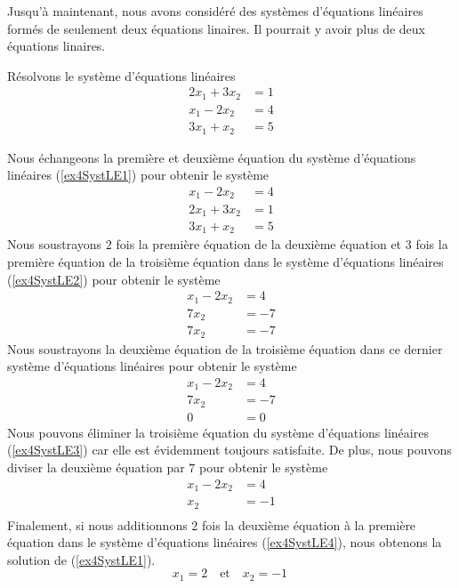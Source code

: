 {Jusqu'à maintenant, nous avons considéré des systèmes d'équations linéaires
formés de seulement deux équations linaires.  Il pourrait y avoir plus
de deux équations linaires.

\begin{egg}
Résolvons le système d'équations linéaires
\begin{equation}\label{ex4SystLE1}
\begin{split}
2x_1 + 3x_2 &= 1\\
x_1 - 2x_2 &= 4\\
3x_1 + x_2 &= 5
\end{split}
\end{equation}

Nous échangeons la première et deuxième équation du système d'équations
linéaires (\ref{ex4SystLE1}) pour obtenir le système
\begin{equation}\label{ex4SystLE2}
\begin{split}
x_1 - 2x_2 &= 4\\
2x_1 + 3x_2 &= 1\\
3x_1 + x_2 &= 5
\end{split}
\end{equation}
Nous soustrayons $2$ fois la première équation de la deuxième équation et
$3$ fois la première équation de la troisième équation dans le
système d'équations linéaires (\ref{ex4SystLE2}) pour obtenir le système 
\[
\begin{split}
x_1 - 2x_2 &= 4\\
7x_2 &= -7\\
7x_2 &= -7
\end{split}
\]
Nous soustrayons la deuxième équation de la troisième équation dans ce
dernier système d'équations linéaires pour obtenir le système
\begin{equation}\label{ex4SystLE3}
\begin{split}
x_1 - 2x_2 &= 4\\
7x_2 &= -7\\
0 &= 0
\end{split}
\end{equation}
Nous pouvons éliminer la troisième équation du système d'équations
linéaires (\ref{ex4SystLE3}) car elle est évidemment toujours
satisfaite.  De plus, nous pouvons diviser la deuxième équation par $7$
pour obtenir le système
\begin{equation}\label{ex4SystLE4}
\begin{split}
x_1 - 2x_2 &= 4\\
x_2 &= -1\\
\end{split}
\end{equation}
Finalement, si nous additionnons $2$ fois la deuxième équation à la
première équation dans le système d'équations linéaires
(\ref{ex4SystLE4}), nous obtenons la solution de (\ref{ex4SystLE1}).
\[
x_1 = 2 \quad \text{et} \quad x_2 = -1 \ 
\]


\end{egg}}
